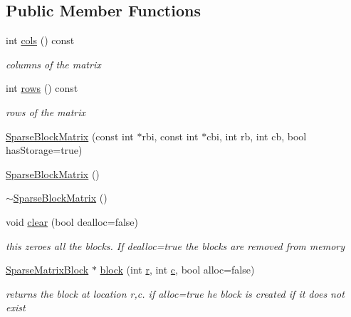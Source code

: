 \subsection*{Public Member Functions}
\begin{DoxyCompactItemize}
\item 
int \hyperlink{classg2o_1_1SparseBlockMatrix_ab854ca59f370d93229852e32a7b49d3e}{cols} () const 
\begin{DoxyCompactList}\small\item\em columns of the matrix \end{DoxyCompactList}\item 
int \hyperlink{classg2o_1_1SparseBlockMatrix_adf18fb267e545b9036314cf9f8f10473}{rows} () const 
\begin{DoxyCompactList}\small\item\em rows of the matrix \end{DoxyCompactList}\item 
\hyperlink{classg2o_1_1SparseBlockMatrix_a0407f26837522322d7b7fd7a5259ee3c}{Sparse\+Block\+Matrix} (const int $\ast$rbi, const int $\ast$cbi, int rb, int cb, bool has\+Storage=true)
\item 
\hyperlink{classg2o_1_1SparseBlockMatrix_af9b8a9cb09a88bc444775a9974db8760}{Sparse\+Block\+Matrix} ()
\item 
\hyperlink{classg2o_1_1SparseBlockMatrix_a70d18ec0265a69e1291083e20a5bc95e}{$\sim$\+Sparse\+Block\+Matrix} ()
\item 
void \hyperlink{classg2o_1_1SparseBlockMatrix_af14b7aaa588b339f2c06793fcc0d4e09}{clear} (bool dealloc=false)
\begin{DoxyCompactList}\small\item\em this zeroes all the blocks. If dealloc=true the blocks are removed from memory \end{DoxyCompactList}\item 
\hyperlink{classg2o_1_1SparseBlockMatrix_ab2f7376cbf055803fda6527dcc43e3be}{Sparse\+Matrix\+Block} $\ast$ \hyperlink{classg2o_1_1SparseBlockMatrix_aaca7b38d2e9a18eebf9e6f5957af0cf7}{block} (int \hyperlink{sparse__helper_8cpp_acab531abaa74a7e664e3986f2522b33a}{r}, int \hyperlink{sparse__helper_8cpp_a4e1e0e72dd773439e333c84dd762a9c3}{c}, bool alloc=false)
\begin{DoxyCompactList}\small\item\em returns the block at location r,c. if alloc=true he block is created if it does not exist \end{DoxyCompactList}\item 

\end{DoxyCompactItemize}
